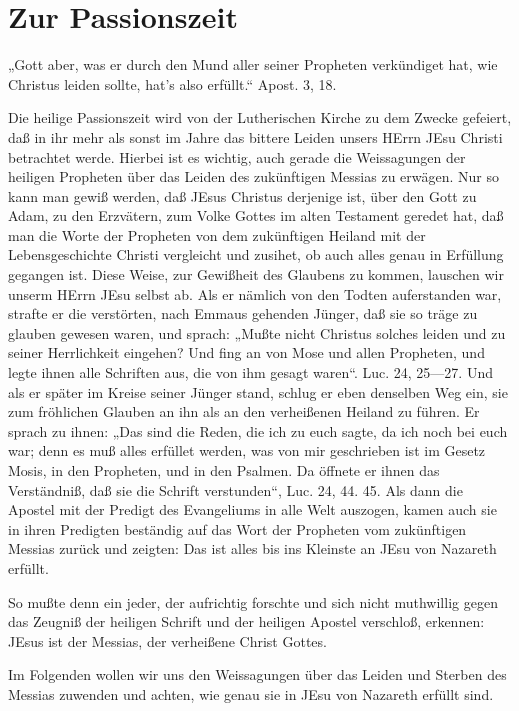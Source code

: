 \chapter{Zur Passionszeit}

„Gott aber, was er durch den Mund aller seiner Propheten verkündiget hat, wie Christus leiden sollte, hat’s also erfüllt.“ Apost. 3, 18.

Die heilige Passionszeit wird von der Lutherischen Kirche zu dem Zwecke gefeiert, daß in ihr mehr als sonst im Jahre das bittere Leiden unsers HErrn JEsu Christi betrachtet werde. Hierbei ist es wichtig, auch gerade die Weissagungen der heiligen Propheten über das Leiden des zukünftigen Messias zu erwägen. Nur so kann man gewiß werden, daß JEsus Christus derjenige ist, über den Gott zu Adam, zu den Erzvätern, zum Volke Gottes im alten Testament geredet hat, daß man die Worte der Propheten von dem zukünftigen Heiland mit der Lebensgeschichte Christi vergleicht und zusihet, ob auch alles genau in Erfüllung gegangen ist. Diese Weise, zur Gewißheit des Glaubens zu kommen, lauschen wir unserm HErrn JEsu selbst ab. Als er nämlich von den Todten auferstanden war, strafte er die verstörten, nach Emmaus gehenden Jünger, daß sie so träge zu glauben gewesen waren, und sprach: „Mußte nicht Christus solches leiden und zu seiner Herrlichkeit eingehen? Und fing an von Mose und allen Propheten, und legte ihnen alle Schriften aus, die von ihm gesagt waren“. Luc. 24, 25—27. Und als er später im Kreise seiner Jünger stand, schlug er eben denselben Weg ein, sie zum fröhlichen Glauben an ihn als an den verheißenen Heiland zu führen. Er sprach zu ihnen: „Das sind die Reden, die ich zu euch sagte, da ich noch bei euch war; denn es muß alles erfüllet werden, was von mir geschrieben ist im Gesetz Mosis, in den Propheten, und in den Psalmen. Da öffnete er ihnen das Verständniß, daß sie die Schrift verstunden“, Luc. 24, 44. 45. Als dann die Apostel mit der Predigt des Evangeliums in alle Welt auszogen, kamen auch sie in ihren Predigten beständig auf das Wort der Propheten vom zukünftigen Messias zurück und zeigten: Das ist alles bis ins Kleinste an JEsu von Nazareth erfüllt.

So mußte denn ein jeder, der aufrichtig forschte und sich nicht muthwillig gegen das Zeugniß der heiligen Schrift und der heiligen Apostel verschloß, erkennen: JEsus ist der Messias, der verheißene Christ Gottes.

Im Folgenden wollen wir uns den Weissagungen über das Leiden und Sterben des Messias zuwenden und achten, wie genau sie in JEsu von Nazareth erfüllt sind.

